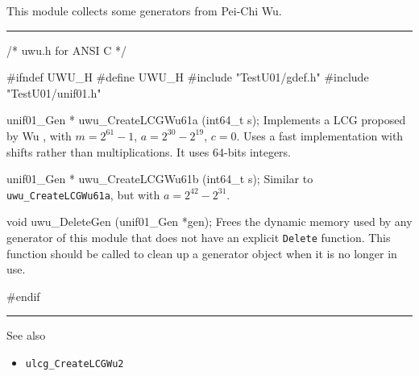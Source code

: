 
This module collects some generators from Pei-Chi Wu.


\bigskip
\hrule
\code\hide
/* uwu.h for ANSI C */

#ifndef UWU_H
#define UWU_H
\endhide
#include "TestU01/gdef.h"
#include "TestU01/unif01.h"


unif01_Gen * uwu_CreateLCGWu61a (int64_t s);
\endcode
  \tab  Implements a LCG proposed by Wu \cite{rWU97a},
  with $m= 2^{61}-1$, $a = 2^{30} - 2^{19}$, $c=0$.
  Uses a fast implementation with shifts rather than
  multiplications.
  It uses 64-bits integers. %
 \endtab
\code


unif01_Gen * uwu_CreateLCGWu61b (int64_t s);
\endcode
  \tab   Similar to {\tt uwu\_CreateLCGWu61a},
   but with  $a = 2^{42} - 2^{31}$.
 \endtab
\code
\endcode




\code


void uwu_DeleteGen (unif01_Gen *gen);
\endcode
 \tab Frees the dynamic memory used by any generator of this module
  that does not have an explicit {\tt Delete} function.
  This function should be called to clean up a generator object
  when it is no longer in use.
 \endtab
\code

\hide
#endif
\endhide
\endcode


\bigskip
\hrule
\bigskip

{
See also
\bigskip

\setlength{\partopsep}{0pt}
\setlength{\parskip}{0pt}
\setlength{\topsep}{0pt}
\setlength{\itemsep}{0pt}

\begin{itemize}
\item {\tt ulcg\_CreateLCGWu2}
\end{itemize}
}
